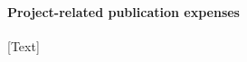 \documentclass[a4paper,12pt]{article}
\begin{document}
\begin{itemize}[label=--,leftmargin=0.5cm]
[Text]

\paragraph{Project-related publication expenses}

[Text]

















\end{itemize}
\end{document}
